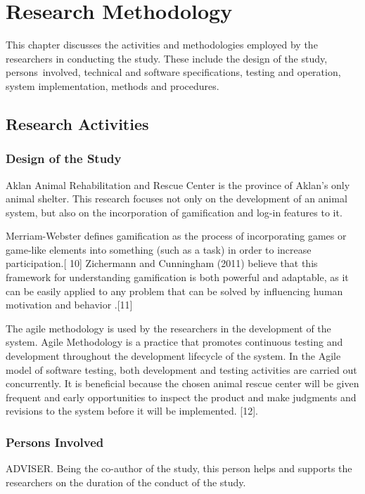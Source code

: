 \chapter{Research Methodology}
This chapter discusses the activities and methodologies employed by the researchers in conducting the study. These include the design of the study, persons involved, technical and software specifications, testing and operation, system implementation, methods and procedures.

\section{Research Activities}

\subsection{Design of the Study}

Aklan Animal Rehabilitation and Rescue Center is the province of Aklan’s only
animal shelter. This research focuses not only on the development of an animal
system, but also on the incorporation of gamification and log-in features to it.

Merriam-Webster defines gamification as the process of incorporating games
or game-like elements into something (such as a task) in order to increase participation.[
10] Zichermann and Cunningham (2011) believe that this framework
for understanding gamification is both powerful and adaptable, as it can be easily
applied to any problem that can be solved by influencing human motivation and
behavior .[11]

The agile methodology is used by the researchers in the development of the
system. Agile Methodology is a practice that promotes continuous testing and
development throughout the development lifecycle of the system. In the Agile
model of software testing, both development and testing activities are carried out
concurrently. It is beneficial because the chosen animal rescue center will be given
frequent and early opportunities to inspect the product and make judgments and
revisions to the system before it will be implemented. [12].

\subsection{Persons Involved}

ADVISER. Being the co-author of the study, this person helps and supports
the researchers on the duration of the conduct of the study.

